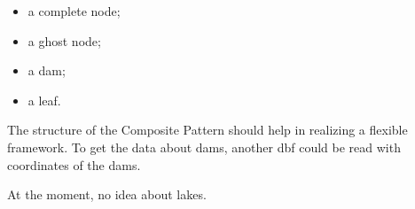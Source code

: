 \begin{itemize}
\item a complete node;
\item a ghost node;
\item a dam;
\item a leaf.
\end{itemize}
The structure of the Composite Pattern should help in realizing a
flexible framework. To get the data about dams, another dbf could be
read with coordinates of the dams.
\par\medskip
At the moment, no idea about lakes.


